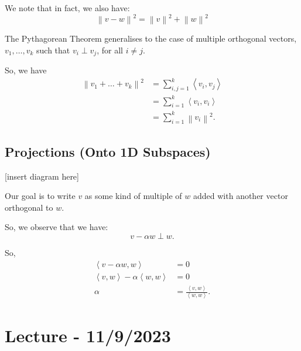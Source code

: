 \documentclass[openany]{book}
\newcommand{\norm}[1]{\left\lVert{#1}\right\rVert}
\newcommand{\innerproduct}[2]{\left\langle{#1}, {#2}\right\rangle}
\begin{document}
We note that in fact, we also have:
\begin{equation*}
	\norm{v-w}^{2} = \norm{v}^{2} + \norm{w}^{2}
\end{equation*}

\begin{rmk}
	The Pythagorean Theorem generalises to the case of multiple orthogonal vectors, $v_{1}, \ldots, v_{k}$ such that $v_{i} \perp v_{j}$, for all $i \neq j$.
	
	So, we have
	\begin{align*}
		\norm{v_{1} + \ldots + v_{k}}^{2} &= \sum_{i,j = 1}^{k} \innerproduct{v_{i}}{v_{j}} \\
		&= \sum_{i=1}^{k} \innerproduct{v_{i}}{v_{i}} \\
		&= \sum_{i=1}^{k}\norm{v_{i}}^{2}.
	\end{align*}
\end{rmk}

\subsection{Projections (Onto 1D Subspaces)}
[insert diagram here]

Our goal is to write $v$ as some kind of multiple of $w$ added with another vector orthogonal to $w$.

So, we observe that we have:
\begin{equation*}
	v - \alpha w \perp w.
\end{equation*}

So,
\begin{align*}
	\innerproduct{v - \alpha w}{w} &= 0 \\
	\innerproduct{v}{w} - \alpha \innerproduct{w}{w} &= 0 \\
	\alpha &= \frac{\innerproduct{v}{w}}{\innerproduct{w}{w}}.
\end{align*}

\section{Lecture - 11/9/2023}
\end{document}
